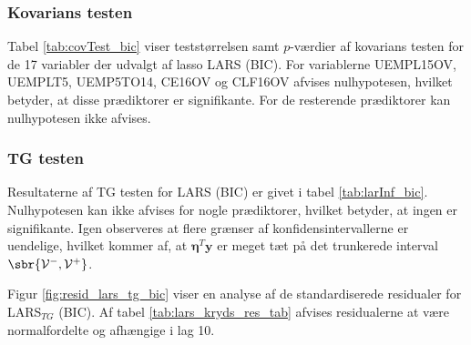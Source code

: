 \subsubsection{Kovarians testen}
Tabel \ref{tab:covTest_bic} viser teststørrelsen samt $p$-værdier af kovarians testen for de 17 variabler der udvalgt af lasso LARS (BIC). 
For variablerne  \textcolor{blue3}{UEMPL15OV}, \textcolor{blue3}{UEMPLT5}, \textcolor{blue3}{UEMP5TO14}, \textcolor{blue3}{CE16OV} og \textcolor{blue3}{CLF16OV} afvises nulhypotesen, hvilket betyder, at disse prædiktorer er signifikante. 
For de resterende prædiktorer kan nulhypotesen ikke afvises. 



\subsubsection{TG testen}
Resultaterne af TG testen for LARS (BIC) er givet i tabel \ref{tab:larInf_bic}.
Nulhypotesen kan ikke afvises for nogle prædiktorer, hvilket betyder, at ingen er signifikante.
Igen observeres at flere grænser af konfidensintervallerne er uendelige, hvilket kommer af, at $\boldsymbol{\eta}^T \textbf{y}$ er meget tæt på det trunkerede interval \(\sbr{\mathcal{V}^-, \mathcal{V}^+}\).



Figur \ref{fig:resid_lars_tg_bic} viser en analyse af de standardiserede residualer for LARS$_{TG}$ (BIC). 
Af tabel \ref{tab:lars_kryds_res_tab} afvises residualerne at være normalfordelte og afhængige i lag 10.






